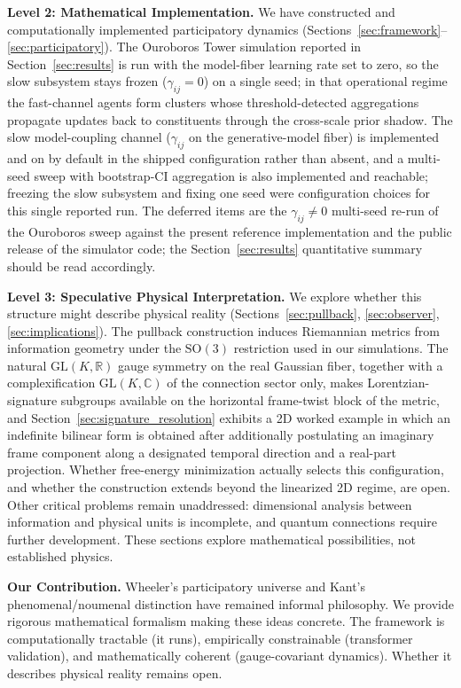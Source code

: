 \documentclass[11pt]{article}
\begin{document}
\textbf{Level 2: Mathematical Implementation.} We have constructed and computationally implemented participatory dynamics (Sections~\ref{sec:framework}--\ref{sec:participatory}). The Ouroboros Tower simulation reported in Section~\ref{sec:results} is run with the model-fiber learning rate set to zero, so the slow subsystem stays frozen ($\gamma_{ij} = 0$) on a single seed; in that operational regime the fast-channel agents form clusters whose threshold-detected aggregations propagate updates back to constituents through the cross-scale prior shadow. The slow model-coupling channel ($\gamma_{ij}$ on the generative-model fiber) is implemented and on by default in the shipped configuration rather than absent, and a multi-seed sweep with bootstrap-CI aggregation is also implemented and reachable; freezing the slow subsystem and fixing one seed were configuration choices for this single reported run. The deferred items are the $\gamma_{ij} \neq 0$ multi-seed re-run of the Ouroboros sweep against the present reference implementation and the public release of the simulator code; the Section~\ref{sec:results} quantitative summary should be read accordingly.

\textbf{Level 3: Speculative Physical Interpretation.} We explore whether this structure might describe physical reality (Sections~\ref{sec:pullback}, \ref{sec:observer}, \ref{sec:implications}). The pullback construction induces Riemannian metrics from information geometry under the $\mathrm{SO}(3)$ restriction used in our simulations. The natural $\mathrm{GL}(K, \mathbb{R})$ gauge symmetry on the real Gaussian fiber, together with a complexification $\mathrm{GL}(K, \mathbb{C})$ of the connection sector only, makes Lorentzian-signature subgroups available on the horizontal frame-twist block of the metric, and Section~\ref{sec:signature_resolution} exhibits a 2D worked example in which an indefinite bilinear form is obtained after additionally postulating an imaginary frame component along a designated temporal direction and a real-part projection. Whether free-energy minimization actually selects this configuration, and whether the construction extends beyond the linearized 2D regime, are open. Other critical problems remain unaddressed: dimensional analysis between information and physical units is incomplete, and quantum connections require further development. These sections explore mathematical possibilities, not established physics.

\textbf{Our Contribution.} Wheeler's participatory universe and Kant's phenomenal/noumenal distinction have remained informal philosophy. We provide rigorous mathematical formalism making these ideas concrete. The framework is computationally tractable (it runs), empirically constrainable (transformer validation), and mathematically coherent (gauge-covariant dynamics). Whether it describes physical reality remains open.
\end{document}
